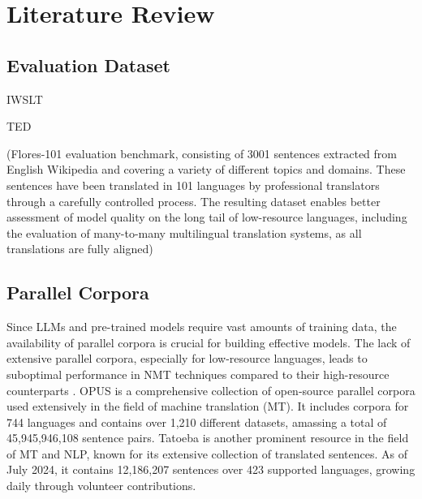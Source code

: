 \documentclass[a4paper]{article}
\begin{document}



\section{Literature Review}

\subsection{Evaluation Dataset}

IWSLT \cite{agarwal-iwstl-2023}

TED \cite{ye-2018-word-embeddings-ted}

(Flores-101 evaluation benchmark, consisting of 3001 sentences extracted from English Wikipedia and covering a variety of different topics and domains. These sentences have been translated in 101 languages by professional translators through a carefully controlled process. The resulting dataset enables better assessment of model quality on the long tail of low-resource languages, including the evaluation of many-to-many multilingual translation systems, as all translations are fully aligned) \cite{goyal-2022-flores}

\subsection{Parallel Corpora}

Since LLMs and pre-trained models require vast amounts of training data, the availability of parallel corpora is crucial for building effective models. The lack of extensive parallel corpora, especially for low-resource languages, leads to suboptimal performance in NMT techniques compared to their high-resource counterparts \cite{ranathunga-2023-nmt-low-res}. OPUS \cite{opus} is a comprehensive collection of open-source parallel corpora used extensively in the field of machine translation (MT). It includes corpora for 744 languages and contains over 1,210 different datasets, amassing a total of 45,945,946,108 sentence pairs. Tatoeba \cite{tatoeba} is another prominent resource in the field of MT and NLP, known for its extensive collection of translated sentences. As of July 2024, it contains 12,186,207 sentences over 423 supported languages, growing daily through volunteer contributions.
\end{document}
